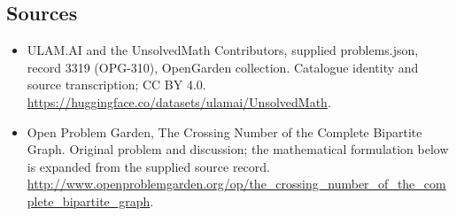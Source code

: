 \documentclass[11pt,a4paper]{article}
\begin{document}
\subsection{Sources}
\begin{itemize}
\item[S1] ULAM.AI and the UnsolvedMath Contributors, supplied problems.json, record 3319 (OPG-310), OpenGarden collection. Catalogue identity and source transcription; CC BY 4.0.
\url{https://huggingface.co/datasets/ulamai/UnsolvedMath}.
\item[S2] Open Problem Garden, The Crossing Number of the Complete Bipartite Graph. Original problem and discussion; the mathematical formulation below is expanded from the supplied source record.
\url{http://www.openproblemgarden.org/op/the_crossing_number_of_the_complete_bipartite_graph}.
\end{itemize}
\end{document}
